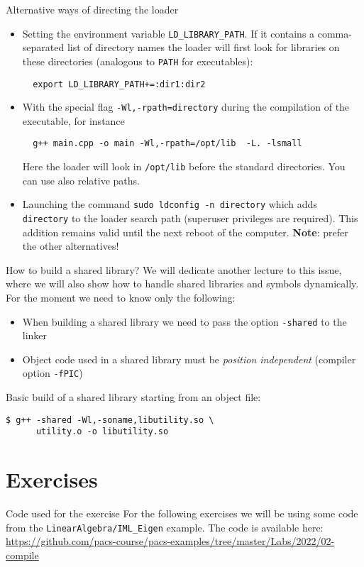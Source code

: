 \documentclass[10pt]{beamer}
\begin{document}
\begin{frame}[fragile]{Alternative ways of directing the loader}
  \begin{itemize}
  \item Setting the environment variable \texttt{LD\_LIBRARY\_PATH}. If
    it contains a comma-separated list of directory names the
    loader will first look for libraries on these directories (analogous to \texttt{PATH} for executables):
\begin{verbatim}
  export LD_LIBRARY_PATH+=:dir1:dir2
\end{verbatim}
\item With the special flag \texttt{-Wl,-rpath=directory}
  during the compilation of the executable, for instance
\begin{verbatim}
  g++ main.cpp -o main -Wl,-rpath=/opt/lib  -L. -lsmall
\end{verbatim}
Here the loader will look in \texttt{/opt/lib} before the standard directories. You can use also relative paths.
\item Launching the command \texttt{sudo ldconfig -n directory} which adds \texttt{directory} to the loader search path (superuser privileges are required). This addition remains valid until the next reboot of the computer. \textbf{Note}: prefer the other alternatives!
  \end{itemize}
\end{frame}

\begin{frame}[fragile]{How to build a shared library?}
  We will dedicate another lecture to this issue, where we will also show how to handle shared libraries and symbols dynamically.
  For the moment we need to know only the following:
  \begin{itemize}
  \item When building a shared library we need to pass the option \texttt{-shared} to the linker
  \item Object code used in a shared library must be \emph{position independent} (compiler option \texttt{-fPIC})
  \end{itemize}

  Basic build of a shared library starting from an object file:
\begin{verbatim}
$ g++ -shared -Wl,-soname,libutility.so \
      utility.o -o libutility.so
\end{verbatim}
\end{frame}


\section{Exercises}
\begin{frame}{Code used for the exercise}
  For the following exercises we will be using some code from the \texttt{LinearAlgebra/IML\_Eigen} example.
  \vfill
  The code is available here: \url{https://github.com/pacs-course/pacs-examples/tree/master/Labs/2022/02-compile}
\end{frame}
\end{document}
